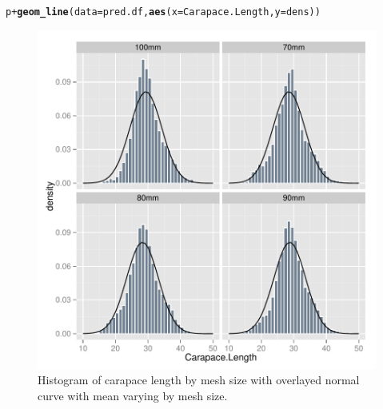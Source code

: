 \documentclass[12pt]{article}\usepackage[]{graphicx}\usepackage[]{color}
\makeatletter
\def\maxwidth{ %
  \ifdim\Gin@nat@width>\linewidth
    \linewidth
  \else
    \Gin@nat@width
  \fi
}
\newcommand{\hlopt}[1]{\textcolor[rgb]{0,0,0}{#1}}%
\newcommand{\hlstd}[1]{\textcolor[rgb]{0.345,0.345,0.345}{#1}}%
\newcommand{\hlkwc}[1]{\textcolor[rgb]{0.333,0.667,0.333}{#1}}%
\newcommand{\hlkwd}[1]{\textcolor[rgb]{0.737,0.353,0.396}{\textbf{#1}}}%
\newenvironment{kframe}{%
 \def\at@end@of@kframe{}%
 \ifinner\ifhmode%
  \def\at@end@of@kframe{\end{minipage}}%
  \begin{minipage}{\columnwidth}%
 \fi\fi%
 \def\FrameCommand##1{\hskip\@totalleftmargin \hskip-\fboxsep
 \colorbox{shadecolor}{##1}\hskip-\fboxsep
     \hskip-\linewidth \hskip-\@totalleftmargin \hskip\columnwidth}%
 \MakeFramed {\advance\hsize-\width
   \@totalleftmargin\z@ \linewidth\hsize
   \@setminipage}}%
 {\par\unskip\endMakeFramed%
 \at@end@of@kframe}
\newenvironment{knitrout}{}{} %
\makeatother
\begin{document}
\begin{knitrout}
\begin{kframe}
\begin{alltt}
\hlstd{p} \hlopt{+} \hlkwd{geom_line}\hlstd{(}\hlkwc{data} \hlstd{= pred.df,} \hlkwd{aes}\hlstd{(}\hlkwc{x} \hlstd{= Carapace.Length,} \hlkwc{y} \hlstd{= dens))}
\end{alltt}
\end{kframe}\begin{figure}

{\centering \includegraphics[width=\maxwidth]{figure/unnamed-chunk-8-1} 

}

\caption[Histogram of carapace length by mesh size with overlayed normal curve with mean varying by mesh size]{Histogram of carapace length by mesh size with overlayed normal curve with mean varying by mesh size.}\label{fig:unnamed-chunk-8}
\end{figure}


\end{knitrout}
\end{document}

